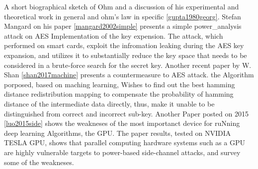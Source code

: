 A short biographical sketch of Ohm and a discussion of his experimental and theoretical work in general and ohm's law in specific \ref{gupta1980georg}.
Stefan Mangard on his paper \ref{mangard2002simple} presents a simple power_analysis attack on AES Implementation of the key expension.
The attack, which performed on smart cards, exploit the infromation leaking during the AES key expansion, 
and utilizes it to substantially reduce the key space that needs to be considered in a brute-force search for the secret key.   
Another recent paper by W. Shan \ref{shan2017machine} presents a countermeasure to AES attack. the Algorithm porposed, based
on maching learning, Wishes to find out the best hamming distance redistribution mapping to compensate the probability of hamming distance of the intermediate data directly,
thus, make it unable to be distinguished from correct and incorrect sub-key.
Another Paper posted on 2015 \ref{luo2015side} shows the weakneses of the most importanct device for ruNning deep learning Algorithms, the GPU.
The paper results, tested on NVIDIA TESLA GPU, shows that parallel computing hardware systems such as a GPU are highly vulnerable targets to power-based side-channel attacks,
and survey some of the weakneses.